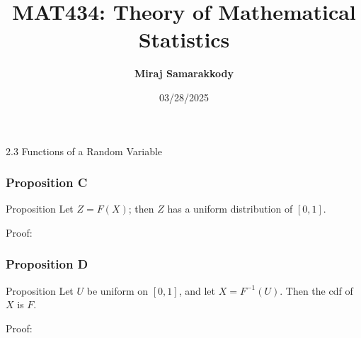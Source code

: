 \documentclass{beamer}
\title{MAT434: Theory of Mathematical Statistics}
\author{\textbf{Miraj Samarakkody}}
\institute{Tougaloo College}
\date{03/28/2025}
\begin{document}
\begin{frame}
    \titlepage
\end{frame}



\begin{frame}{}
    \begin{center}
        \Huge{2.3 Functions of a Random Variable}
    \end{center}

\end{frame}






    


\begin{frame}
    \frametitle{Proposition C}
    \begin{block}{Proposition}
        Let \(Z=F(X)\); then \(Z\) has a uniform distribution of \([0,1]\).
    \end{block}
    \begin{block}{Proof:}
        
    \end{block}


    

\end{frame}

\begin{frame}
    \frametitle{Proposition D}

    \begin{block}{Proposition}
        Let \(U\) be uniform on \([0,1]\), and let \(X = F^{-1}(U)\). Then the cdf of \(X\) is \(F\). 
    \end{block}
    \begin{block}{Proof:}
        
    \end{block}

\end{frame}
\end{document}
